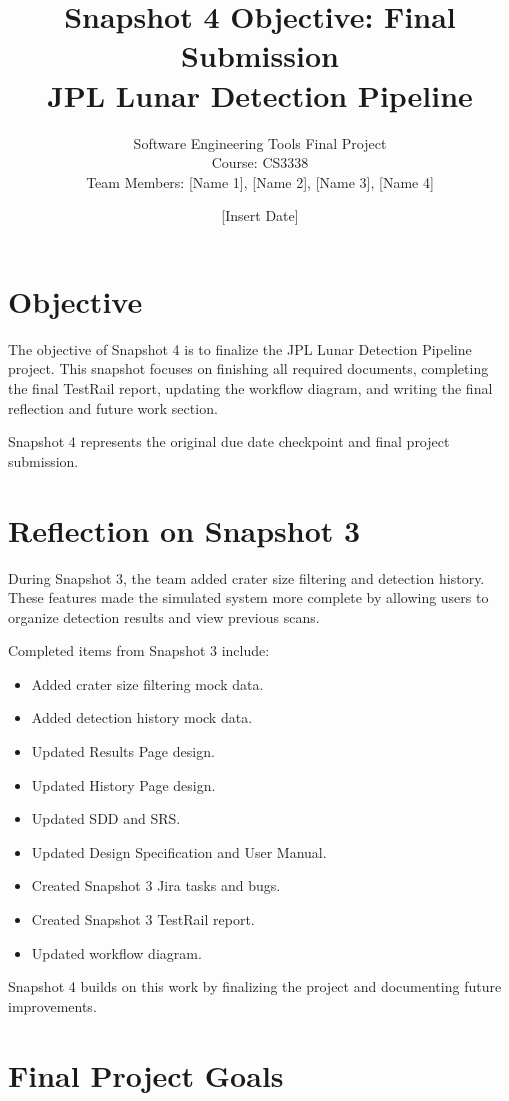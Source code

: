 \documentclass[12pt]{article}
\title{
    \textbf{Snapshot 4 Objective: Final Submission} \\
    JPL Lunar Detection Pipeline
}
\author{
    Software Engineering Tools Final Project \\
    Course: CS3338 \\
    Team Members: [Name 1], [Name 2], [Name 3], [Name 4]
}
\date{[Insert Date]}
\begin{document}
\maketitle
\newpage

\section{Objective}

The objective of Snapshot 4 is to finalize the JPL Lunar Detection Pipeline project. This snapshot focuses on finishing all required documents, completing the final TestRail report, updating the workflow diagram, and writing the final reflection and future work section.

Snapshot 4 represents the original due date checkpoint and final project submission.

\section{Reflection on Snapshot 3}

During Snapshot 3, the team added crater size filtering and detection history. These features made the simulated system more complete by allowing users to organize detection results and view previous scans.

Completed items from Snapshot 3 include:

\begin{itemize}
    \item Added crater size filtering mock data.
    \item Added detection history mock data.
    \item Updated Results Page design.
    \item Updated History Page design.
    \item Updated SDD and SRS.
    \item Updated Design Specification and User Manual.
    \item Created Snapshot 3 Jira tasks and bugs.
    \item Created Snapshot 3 TestRail report.
    \item Updated workflow diagram.
\end{itemize}

Snapshot 4 builds on this work by finalizing the project and documenting future improvements.

\section{Final Project Goals}
\end{document}
